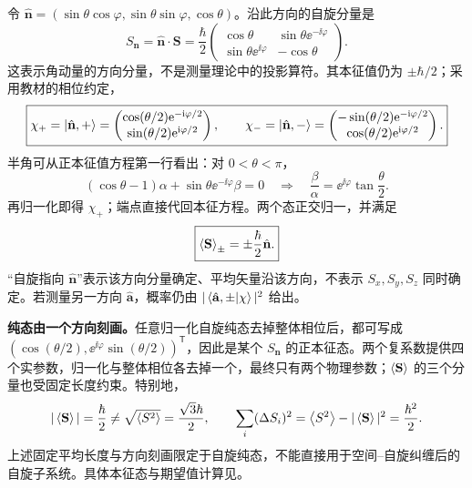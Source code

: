 令 $\hat{\mathbf n}=(\sin\theta\cos\varphi,\sin\theta\sin\varphi,\cos\theta)$。沿此方向的自旋分量是
\begin{equation}
  S_{\mathbf n}=\hat{\mathbf n}\cdot\mathbf S
    =\frac\hbar2\begin{pmatrix}
      \cos\theta&\sin\theta\ee^{-\ii\varphi}\\
      \sin\theta\ee^{\ii\varphi}&-\cos\theta
    \end{pmatrix}.
\end{equation}
这表示角动量的方向分量，不是测量理论中的投影算符。其本征值仍为 $\pm\hbar/2$；采用教材的相位约定，
\begin{equation}
  \boxed{\chi_+=\left|\hat{\mathbf n},+\right\rangle
    =\begin{pmatrix}\cos(\theta/2)\mathrm{e}^{-\mathrm{i}\varphi/2}\\
      \sin(\theta/2)\mathrm{e}^{\mathrm{i}\varphi/2}\end{pmatrix},\qquad
  \chi_-=\left|\hat{\mathbf n},-\right\rangle
    =\begin{pmatrix}-\sin(\theta/2)\mathrm{e}^{-\mathrm{i}\varphi/2}\\
      \cos(\theta/2)\mathrm{e}^{\mathrm{i}\varphi/2}\end{pmatrix}.}
\end{equation}
半角可从正本征值方程第一行看出：对 $0<\theta<\pi$，
\begin{equation}
  (\cos\theta-1)\alpha+\sin\theta\ee^{-\ii\varphi}\beta=0
  \quad\Longrightarrow\quad
  \frac\beta\alpha=\ee^{\ii\varphi}\tan\frac\theta2.
\end{equation}
再归一化即得 $\chi_+$；端点直接代回本征方程。两个态正交归一，并满足
\begin{equation}
  \boxed{\left\langle \mathbf S \right\rangle_\pm=\pm\frac\hbar2\hat{\mathbf n}.}
\end{equation}
“自旋指向 $\hat{\mathbf n}$”表示该方向分量确定、平均矢量沿该方向，不表示 $S_x,S_y,S_z$ 同时确定。若测量另一方向 $\hat{\mathbf a}$，概率仍由 $|\left\langle \hat{\mathbf a},\pm \middle| \chi \right\rangle|^2$ 给出。

\textbf{纯态由一个方向刻画。}任意归一化自旋纯态去掉整体相位后，都可写成 $(\cos(\theta/2),\ee^{\ii\varphi}\sin(\theta/2))^{\mathsf T}$，因此是某个 $S_{\mathbf n}$ 的正本征态。两个复系数提供四个实参数，归一化与整体相位各去掉一个，最终只有两个物理参数；$\left\langle \mathbf S \right\rangle$ 的三个分量也受固定长度约束。特别地，
\begin{equation}
  |\left\langle \mathbf S \right\rangle|=\frac\hbar2
  \ne\sqrt{\left\langle S^2 \right\rangle}=\frac{\sqrt3\hbar}{2},\qquad
  \sum_i(\Delta S_i)^2=\left\langle S^2 \right\rangle-|\left\langle \mathbf S \right\rangle|^2=\frac{\hbar^2}{2}.
\end{equation}
上述固定平均长度与方向刻画限定于自旋纯态，不能直接用于空间--自旋纠缠后的自旋子系统。具体本征态与期望值计算见。

